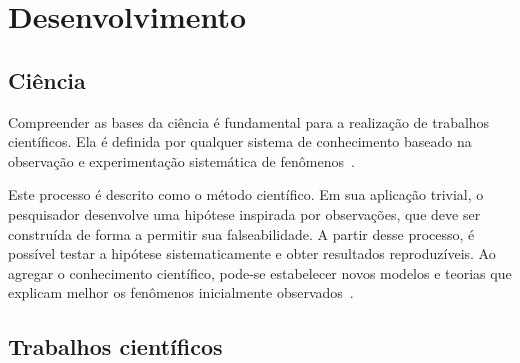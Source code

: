 \section{Desenvolvimento}%
\label{sec:desenvolvimento}

\subsection{Ciência}

Compreender as bases da ciência é fundamental para a realização de trabalhos científicos.
Ela é definida por qualquer sistema de conhecimento baseado na observação e experimentação sistemática de fenômenos~\cite{britannica_2024_science}.

Este processo é descrito como o método científico.
Em sua aplicação trivial, o pesquisador desenvolve uma hipótese inspirada por observações, que deve ser construída de forma a permitir sua falseabilidade.
A partir desse processo, é possível testar a hipótese sistematicamente e obter resultados reproduzíveis.
Ao agregar o conhecimento científico, pode-se estabelecer novos modelos e teorias que explicam melhor os fenômenos inicialmente observados~\cite{britannica_2024_scientific_method}.


\subsection{Trabalhos científicos}